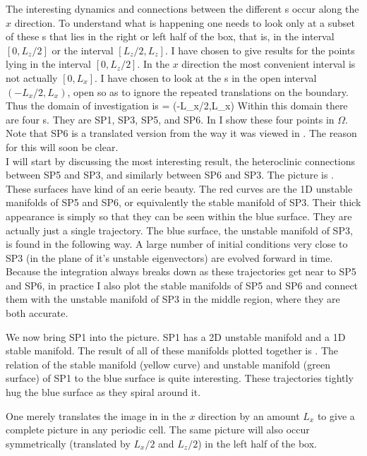  The interesting dynamics and connections between the different \stagp s occur
 along the $x$ direction. To understand what is happening one needs
 to look only at a subset of these \stagp s that lies in the right or left half of the box, that
 is, in the interval $[0,L_{z}/2]$ or the interval $[L_{z}/2,L_{z}]$. I have chosen
 to give results for the points lying in the interval $[0,L_{z}/2]$. In
 the $x$ direction the most convenient interval is not actually
 $[0,L_{x}]$. I have chosen to look at the \stagp s in the open interval
 $(-L_{x}/2,L_{x})$, open so as to ignore the repeated translations on the boundary. Thus the domain of investigation is
 \beq \Omega = (-L_{x}/2,L_{x}) \times [-1,1] \times [0,L_{z}/2]
 \eeq
 Within this domain there are four \stagp s. They are SP1, SP3, SP5, and
 SP6.
 In  I show these four points in $\Omega$. Note that SP6 is a
 translated version from the way it was viewed in
 . The reason for this will soon be
 clear. \\

 I will start by discussing the most interesting result, the
 heteroclinic connections between SP5 and SP3, and similarly between SP6 and
 SP3. The picture is . These surfaces have
 kind of an eerie beauty. The red curves are the 1D unstable manifolds
 of SP5 and SP6, or equivalently the stable manifold of SP3. Their thick appearance
 is simply so that they can be seen within the blue surface. They are actually just a single trajectory. The
 blue surface, the unstable manifold of SP3, is found in the following way. A large number of initial
 conditions very close to SP3 (in the plane of it's unstable eigenvectors) are evolved forward in
 time. Because the integration always breaks down as these trajectories
 get near to SP5 and SP6, in practice I also plot the stable
 manifolds of SP5 and SP6 and connect them with the unstable
 manifold of SP3 in the middle region, where they are both accurate.

 We now bring SP1 into the picture. SP1 has a 2D unstable manifold
 and a 1D stable manifold. The result of all of these manifolds
 plotted together is . The relation of the
 stable manifold (yellow curve) and unstable manifold (green surface) of SP1
 to the blue surface is quite interesting. These trajectories
 tightly hug the blue surface as they spiral around it.

 One merely translates the image in  in the
 $x$ direction by an amount $L_{x}$ to give a complete picture in
 any periodic cell. The same picture will also occur symmetrically
 (translated by $L_{x}/2$ and $L_{z}/2$) in the left half of the
 box.




